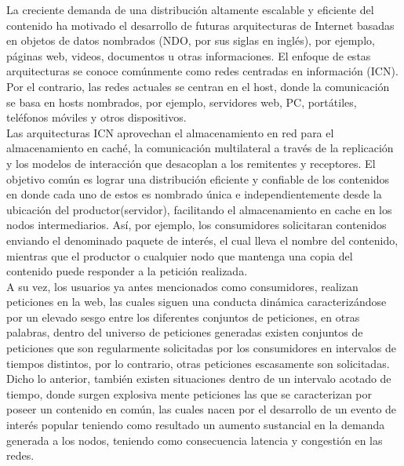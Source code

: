 \documentclass[12pt]{ociamthesis}  %
\begin{document}
La creciente demanda de una distribución altamente escalable y eficiente del contenido ha motivado el desarrollo de futuras arquitecturas de Internet basadas en objetos de datos nombrados (NDO, por sus siglas en inglés), por ejemplo, páginas web, videos, documentos u otras informaciones. El enfoque de estas arquitecturas se conoce comúnmente como redes centradas en información (ICN). Por el contrario, las redes actuales se centran en el host, donde la comunicación se basa en hosts nombrados, por ejemplo, servidores web, PC, portátiles, teléfonos móviles y otros dispositivos\cite{ahlgren2012survey}.\\

Las arquitecturas ICN aprovechan el almacenamiento en red para el almacenamiento en caché, la comunicación multilateral a través de la replicación y los modelos de interacción que desacoplan a los remitentes y receptores. El objetivo común es lograr una distribución eficiente y confiable de los contenidos en donde cada uno de estos es nombrado única e independientemente desde la ubicación del productor(servidor), facilitando el almacenamiento en cache en los nodos intermediarios. Así, por ejemplo, los consumidores solicitaran contenidos enviando el denominado paquete de interés, el cual lleva el nombre del contenido, mientras que el productor o cualquier nodo que mantenga una copia del contenido puede responder a la petición realizada.\cite{ahlgren2012survey}\\

A su vez, los usuarios ya antes mencionados como consumidores, realizan peticiones en la web, las cuales siguen una conducta dinámica caracterizándose por un elevado sesgo entre los diferentes conjuntos de peticiones, en otras palabras, dentro del universo de peticiones generadas existen conjuntos de peticiones que son regularmente solicitadas por los consumidores en intervalos de tiempos distintos, por lo contrario, otras peticiones escasamente son solicitadas. Dicho lo anterior, también existen situaciones dentro de un intervalo acotado de tiempo, donde surgen explosiva mente peticiones las que se caracterizan por poseer un contenido en común, las cuales nacen por el desarrollo de un evento de interés popular teniendo como resultado un aumento sustancial en la demanda generada a los nodos, teniendo como consecuencia latencia y congestión en las redes.
\end{document}

